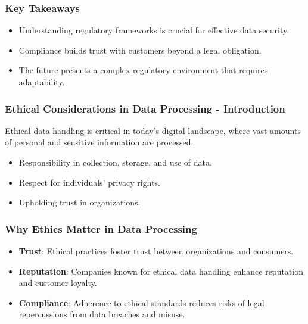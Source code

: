 \documentclass{beamer}
\begin{document}
\begin{frame}[fragile]
    \frametitle{Key Takeaways}
    \begin{itemize}
        \item Understanding regulatory frameworks is crucial for effective data security.
        \item Compliance builds trust with customers beyond a legal obligation.
        \item The future presents a complex regulatory environment that requires adaptability.
    \end{itemize}
\end{frame}

\begin{frame}[fragile]
    \frametitle{Ethical Considerations in Data Processing - Introduction}
    Ethical data handling is critical in today’s digital landscape, where vast amounts of personal and sensitive information are processed.
    \begin{itemize}
        \item Responsibility in collection, storage, and use of data.
        \item Respect for individuals' privacy rights.
        \item Upholding trust in organizations.
    \end{itemize}
\end{frame}

\begin{frame}[fragile]
    \frametitle{Why Ethics Matter in Data Processing}
    \begin{itemize}
        \item \textbf{Trust}: Ethical practices foster trust between organizations and consumers.
        \item \textbf{Reputation}: Companies known for ethical data handling enhance reputation and customer loyalty.
        \item \textbf{Compliance}: Adherence to ethical standards reduces risks of legal repercussions from data breaches and misuse.
    \end{itemize}
\end{frame}
\end{document}

